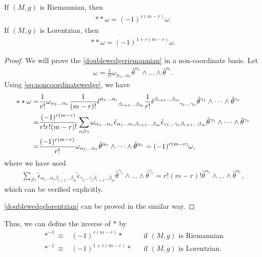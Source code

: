 \documentclass[10pt]{article}
\begin{document}
\begin{theorem}
    If $(M,g)$ is Riemannian, then
    \begin{align}
        \ast\ast\omega=(-1)^{r(m-r)}\omega.\label{doublewedgeriemannian}
    \end{align}
    If $(M,g)$ is Lorentzian, then
    \begin{align}
        \ast\ast\omega=(-1)^{1+r(m-r)}\omega.\label{doublewedgelorentzian}
    \end{align}
\end{theorem}
\begin{proof}
    We will prove the \eqref{doublewedgeriemannian} in a non-coordinate basis.
    Let
    \begin{align}
        \omega=\frac{1}{r!}\omega_{\alpha_1\dots\alpha_r}\hat{\theta}^{\alpha_1}\wedge\dots\wedge\hat{\theta}^{\alpha_r}.
    \end{align}
    Using \eqref{eq:noncoordinatewedge}, we have
    \begin{align}
        \ast\ast\omega= & \frac{1}{r!}\omega_{\alpha_1\dots\alpha_r}\frac{1}{(m-r)!}\tensor{\tilde{\epsilon}}{^{\alpha_1\dots\alpha_r}_{\beta_{r+1}\dots\beta_{m}}}\frac{1}{r!}\tensor{\tilde{\epsilon}}{^{\beta_{r+1}\dots\beta_m}_{\gamma_1\dots\gamma_r}}\hat{\theta}^{\gamma_1}\wedge\dots\wedge\hat{\theta}^{\gamma_r}\notag \\
        =               & \frac{(-1)^{r(m-r)}}{r!r!(m-r)!}\sum_{\alpha\beta\gamma}\omega_{\alpha_1\dots\alpha_r}\tilde{\epsilon}_{\alpha_1\dots\alpha_r\beta_{r+1}\dots\beta_m}\tilde{\epsilon}_{\gamma_1\dots\gamma_r\beta_{r+1}\dots\beta_m}\hat{\theta}^{\gamma_1}\wedge\dots\wedge\hat{\theta}^{\gamma_r}\notag               \\
        =               & \frac{(-1)^{r(m-r)}}{r!}\omega_{\alpha_1\dots\alpha_r}\hat{\theta}^{\alpha_1}\wedge\dots\wedge\hat{\theta}^{\alpha_r}=(-1)^{r(m-r)}\omega,
    \end{align}
    where we have used
    \begin{align}
        \sum_{\beta\gamma}\tilde{\epsilon}_{\alpha_1\dots\alpha_r\beta_{r+1}\dots\beta_m}\tilde{\epsilon}_{\gamma_1\dots\gamma_r\beta_{r+1}\dots\beta_m}\hat{\theta}^{\gamma_1}\wedge\dots\wedge\hat{\theta}^{\gamma_r}=r!(m-r)!\hat{\theta}^{\alpha_1}\wedge\dots\wedge\hat{\theta}^{\alpha_r},
    \end{align}
    which can be verified explicitly.

    \eqref{doublewedgelorentzian} can be proved in the similar way.
\end{proof}
Thus, we can define the inverse of $\ast$ by
\begin{align}
    \ast^{-1}\equiv & (-1)^{r(m-r)}\ast   &  & \text{if $(M,g)$ is Riemannian}  \\
    \ast^{-1}\equiv & (-1)^{1+r(m-r)}\ast &  & \text{if $(M,g)$ is Lorentzian.}
\end{align}
\end{document}

